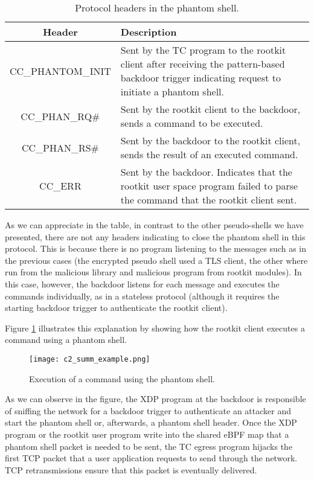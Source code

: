 \begin{table}[htbp]
\begin{tabular}{|c|>{\centering\arraybackslash}p{8cm}|}
\hline
\textbf{Header} & \textbf{Description}\\
\hline
\hline
CC\_PHANTOM\_INIT & Sent by the TC program to the rootkit client after receiving the pattern-based backdoor trigger indicating request to initiate a phantom shell.\\
\hline
CC\_PHAN\_RQ\# & Sent by the rootkit client to the backdoor, sends a command to be executed.\\
\hline
CC\_PHAN\_RS\# & Sent by the backdoor to the rootkit client, sends the result of an executed command.\\
\hline
CC\_ERR & Sent by the backdoor. Indicates that the rootkit user space program failed to parse the command that the rootkit client sent.\\
\hline
\end{tabular}
\caption{Protocol headers in the phantom shell.}
\label{table:phantom_headers}
\end{table}

As we can appreciate in the table, in contrast to the other pseudo-shells we have presented, there are not any headers indicating to close the phantom shell in this protocol. This is because there is no program listening to the messages such as in the previous cases (the encrypted pseudo shell used a TLS client, the other where run from the malicious library and malicious program from rootkit modules). In this case, however, the backdoor listens for each message and executes the commands individually, as in a stateless protocol (although it requires the starting backdoor trigger to authenticate the rootkit client).

Figure \ref{fig:c2_summ_example} illustrates this explanation by showing how the rootkit client executes a command using a phantom shell.

\begin{figure}[htbp]
	\centering
	\texttt{[image: c2\_summ\_example.png]}
	\caption{Execution of a command using the phantom shell.}
	\label{fig:c2_summ_example}
\end{figure}

As we can observe in the figure, the XDP program at the backdoor is responsible of sniffing the network for a backdoor trigger to authenticate an attacker and start the phantom shell or, afterwards, a phantom shell header. Once the XDP program or the rootkit user program write into the shared eBPF map that a phantom shell packet is needed to be sent, the TC egress program hijacks the first TCP packet that a user application requests to send through the network. TCP retransmissions ensure that this packet is eventually delivered.


